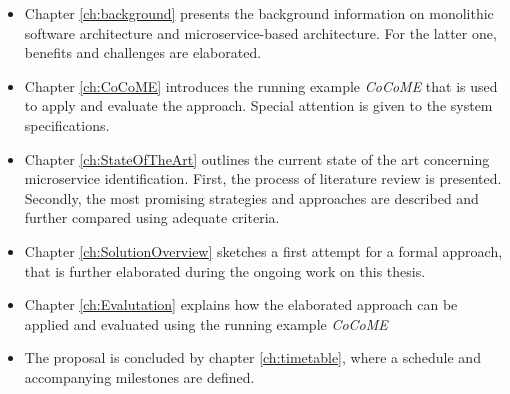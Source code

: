 \begin{itemize}
	\item  Chapter \ref{ch:background} presents the background information on monolithic software architecture and microservice-based architecture. For the latter one, benefits and challenges are elaborated. 
	\item Chapter \ref{ch:CoCoME} introduces the running example \textit{CoCoME} that is used to apply and evaluate the approach. Special attention is given to the system specifications.
	\item Chapter \ref{ch:StateOfTheArt} outlines the current state of the art concerning microservice identification. First, the process of literature review is presented. Secondly, the most promising strategies and approaches are described and further compared using adequate criteria.
	\item Chapter \ref{ch:SolutionOverview} sketches a first attempt for a formal approach, that is further elaborated during the ongoing work on this thesis.
	\item Chapter \ref{ch:Evalutation} explains how the elaborated approach can be applied and evaluated using the running example \textit{CoCoME}
	\item The proposal is concluded by chapter \ref{ch:timetable}, where a schedule and accompanying milestones are defined.
\end{itemize}











